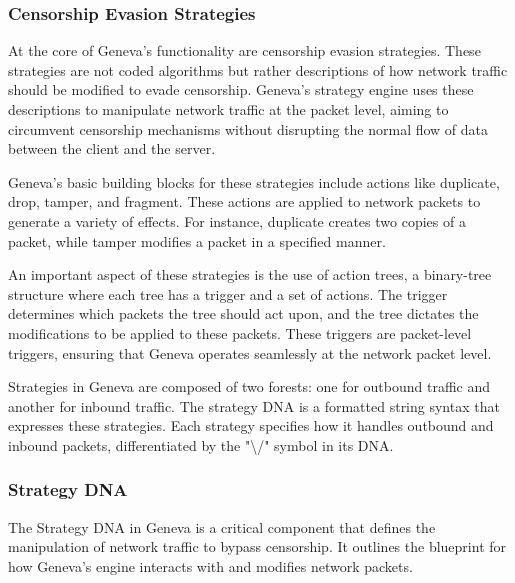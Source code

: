 \documentclass[12pt, fleqn, a4paper]{article}
\begin{document}
\subsubsection{Censorship Evasion Strategies}
At the core of Geneva's functionality are censorship evasion strategies. These strategies are not coded algorithms but rather descriptions of how network traffic should be modified to evade censorship. Geneva's strategy engine uses these descriptions to manipulate network traffic at the packet level, aiming to circumvent censorship mechanisms without disrupting the normal flow of data between the client and the server.

Geneva's basic building blocks for these strategies include actions like duplicate, drop, tamper, and fragment. These actions are applied to network packets to generate a variety of effects. For instance, duplicate creates two copies of a packet, while tamper modifies a packet in a specified manner.

An important aspect of these strategies is the use of action trees, a binary-tree structure where each tree has a trigger and a set of actions. The trigger determines which packets the tree should act upon, and the tree dictates the modifications to be applied to these packets. These triggers are packet-level triggers, ensuring that Geneva operates seamlessly at the network packet level.

Strategies in Geneva are composed of two forests: one for outbound traffic and another for inbound traffic. The strategy DNA is a formatted string syntax that expresses these strategies. Each strategy specifies how it handles outbound and inbound packets, differentiated by the "\textbackslash /" symbol in its DNA.

\subsubsection{Strategy DNA}
The Strategy DNA in Geneva is a critical component that defines the manipulation of network traffic to bypass censorship. It outlines the blueprint for how Geneva's engine interacts with and modifies network packets.
\end{document}
